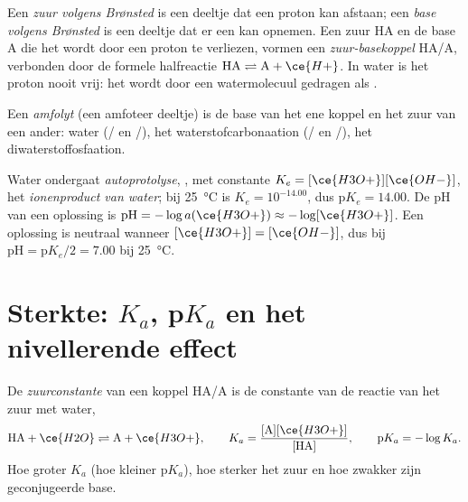 \begin{definition}\label{def:b1:predominant-reaction:bronsted}
Een \emph{zuur volgens Brønsted}
is een deeltje dat een proton  kan afstaan; een \emph{base volgens
Brønsted} is een
deeltje dat er een kan opnemen. Een zuur HA en de base A die het wordt
door een proton te verliezen, vormen een
\emph{zuur-basekoppel} HA/A, verbonden door de
formele halfreactie $\mathrm{HA} \rightleftharpoons
\mathrm{A} + \ce{H+}$. In water is het proton nooit vrij: het wordt door
een watermolecuul gedragen als .
\end{definition}

\begin{definition}[Amfolyt]\label{def:b1:predominant-reaction:ampholyte}
Een \emph{amfolyt} (een amfoteer deeltje) is de base van
het ene koppel en het zuur van een ander: water (/ en
/), het waterstofcarbonaation (/
en /), het diwaterstoffosfaation.
\end{definition}

\begin{definition}\label{def:b1:predominant-reaction:autoprotolysis}
Water ondergaat \emph{autoprotolyse},
, met constante $K_e = [\ce{H3O+}][\ce{OH-}]$, het
\emph{ionenproduct van water}; bij
\qty{25}{\celsius} is $K_e = 10^{-14.00}$, dus $\mathrm{p}K_e = 14.00$. De
pH van een oplossing is $\mathrm{pH} = -\log a(\ce{H3O+}) \approx -\log[\ce{H3O+}]$.
Een oplossing is neutraal wanneer $[\ce{H3O+}] = [\ce{OH-}]$, dus bij
$\mathrm{pH} = \mathrm{p}K_e/2 = 7.00$ bij \qty{25}{\celsius}.
\end{definition}


\section{Sterkte: \texorpdfstring{$K_a$}{Ka}, \texorpdfstring{p$K_a$}{pKa} en het nivellerende effect}

\begin{definition}[Zuurconstante]\label{def:b1:predominant-reaction:acidity-constant}
De \emph{zuurconstante} van een koppel HA/A is de
constante van de reactie van het zuur met water,
\[
  \mathrm{HA} + \ce{H2O} \rightleftharpoons \mathrm{A} + \ce{H3O+}, \qquad
  K_a = \frac{[\mathrm{A}][\ce{H3O+}]}{[\mathrm{HA}]}, \qquad
  \mathrm{p}K_a = -\log K_a .
\]
Hoe groter $K_a$ (hoe kleiner $\mathrm{p}K_a$), hoe sterker het zuur en
hoe zwakker zijn geconjugeerde base.
\end{definition}

